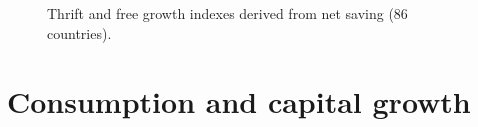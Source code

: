 \documentclass[a4paper,fleqn]{latex_styles/cas-sc}
\begin{document}
\FloatBarrier
\begin{figure}[pos=H]
    \centering
    \quad %
    \captionsetup{justification=centering}
    \caption{Thrift and free growth indexes derived from net saving (86 countries).}
    \label{fig-si_plots}
\end{figure}
%

\FloatBarrier
%
\hypertarget{consumption-and-capital-growth}{%
\section{Consumption and capital growth}\label{consumption-and-capital-growth}}
\end{document}
